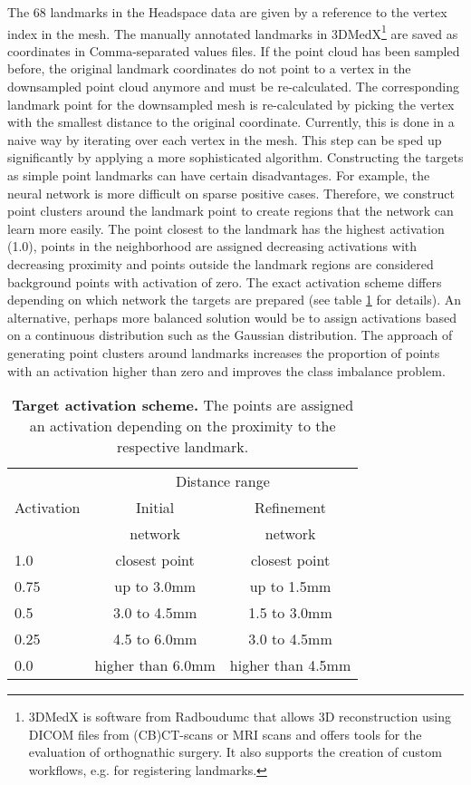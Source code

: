 \documentclass[class=article, crop=false]{standalone}
\begin{document}
The 68 landmarks in the Headspace data are given by a reference to the vertex index in the mesh. The manually annotated landmarks in 3DMedX\footnote{3DMedX is software from Radboudumc that allows 3D reconstruction using DICOM files from (CB)CT-scans or MRI scans and offers tools for the evaluation of orthognathic surgery. It also supports the creation of custom workflows, e.g. for registering landmarks.}\cite{3dmedx} are saved as coordinates in Comma-separated values files. If the point cloud has been sampled before,
the original landmark coordinates do not point to a vertex in the downsampled point cloud anymore and must be re-calculated. The corresponding landmark point for the downsampled mesh is re-calculated by picking the vertex with the smallest distance to the original coordinate. Currently, this is done in a naive way by iterating over each vertex in the mesh. This step can be sped up significantly by applying a more sophisticated algorithm. Constructing the targets as simple point landmarks can have certain disadvantages. For example, the neural network is more difficult on sparse positive cases. Therefore, we construct point clusters around the landmark point to create regions that the network can learn more easily. The point closest to the landmark has the highest activation (1.0), points in the neighborhood are assigned decreasing activations with decreasing proximity and points outside the landmark regions are considered background points with activation of zero. The exact activation scheme differs depending on which network the targets are prepared (see table \ref{tab:activation-scheme} for details). An alternative, perhaps more balanced solution would be to assign activations based on a continuous distribution such as the Gaussian distribution. The approach of generating point clusters around landmarks increases the proportion of points with an activation higher than zero and improves the class imbalance problem.

\begin{table}[]
\centering
\begin{tabular}[t]{lcc}\toprule
 & \multicolumn{2}{c}{Distance range} \\
\cmidrule(lr){2-3}
Activation & Initial & Refinement\\
& network & network\\
\hline
1.0        & closest point  & closest point    \\
0.75       & up to 3.0mm & up to 1.5mm    \\
0.5        & 3.0 to 4.5mm & 1.5 to 3.0mm   \\
0.25       & 4.5 to 6.0mm & 3.0 to 4.5mm  \\
0.0       & higher than 6.0mm & higher than 4.5mm  \\\bottomrule
\end{tabular}
\caption{\textbf{Target activation scheme.} The points are assigned an activation depending on the proximity to the respective landmark.}
\label{tab:activation-scheme}
\end{table}
\end{document}
